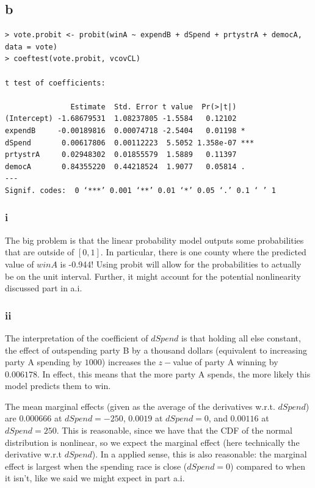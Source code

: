 \documentclass[12pt,letterpaper]{article}
\theoremstyle{definition}
\begin{document}
\subsection*{b}

\begin{Verbatim}[fontsize=\small]
> vote.probit <- probit(winA ~ expendB + dSpend + prtystrA + democA, data = vote)
> coeftest(vote.probit, vcovCL)

t test of coefficients:

               Estimate  Std. Error t value  Pr(>|t|)
(Intercept) -1.68679531  1.08237805 -1.5584   0.12102
expendB     -0.00189816  0.00074718 -2.5404   0.01198 *
dSpend       0.00617806  0.00112223  5.5052 1.358e-07 ***
prtystrA     0.02948302  0.01855579  1.5889   0.11397
democA       0.84355220  0.44218524  1.9077   0.05814 .
---
Signif. codes:  0 ‘***’ 0.001 ‘**’ 0.01 ‘*’ 0.05 ‘.’ 0.1 ‘ ’ 1
\end{Verbatim}

\subsubsection*{i}

The big problem is that the linear probability model outputs some probabilities that are outside of $[0,1]$. In particular, there is one county where the predicted value of $winA$ is -0.944! Using probit will allow for the probabilities to actually be on the unit interval. Further, it might account for the potential nonlinearity discussed part in a.i.

\subsubsection*{ii}

The interpretation of the coefficient of $dSpend$ is that holding all else constant, the effect of outspending party B by a thousand dollars (equivalent to increasing party A spending by $1000$) increases the $z-$value of party A winning by $0.006178$. In effect, this means that the more party A spends, the more likely this model predicts them to win.

The mean marginal effects (given as the average of the derivatives w.r.t. $dSpend$) are $0.000666$ at $dSpend = -250$, $0.0019$ at $dSpend = 0$, and $0.00116$ at $dSpend = 250$. This is reasonable, since we have that the CDF of the normal distribution is nonlinear, so we expect the marginal effect (here technically the derivative w.r.t $dSpend$). In a applied sense, this is also reasonable: the marginal effect is largest when the spending race is close ($dSpend = 0$) compared to when it isn't, like we said we might expect in part a.i.
\end{document}
